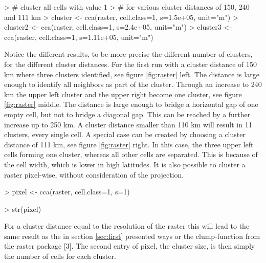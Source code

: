 \documentclass[10pt,a4paper]{article}
\begin{document}
\begin{Schunk}
\begin{Sinput}
> # cluster all cells with value 1
> # for various cluster distances of 150, 240 and 111 km
> cluster <- cca(raster, cell.class=1, s=1.5e+05, unit="m")
> cluster2 <- cca(raster, cell.class=1, s=2.4e+05, unit="m")
> cluster3 <- cca(raster, cell.class=1, s=1.11e+05, unit="m")
\end{Sinput}
\end{Schunk}


Notice the different results, to be more precise the different number of clusters, for the different cluster distances. For the first run with a cluster distance of 150 km where three clusters identified, see figure \ref{fig:raster} left. The distance is large enough to identify all neighbors as part of the cluster. Through an increase to 240 km the upper left cluster and the upper right become one cluster, see figure \ref{fig:raster} middle. The distance is large enough to bridge a horizontal gap of one empty cell, but not to bridge a diagonal gap. This can be reached by a further increase up to 250 km.
A cluster distance smaller than 110 km will result in 11 clusters, every single cell. A special case can be created by choosing a cluster distance of 111 km, see figure \ref{fig:raster} right. In this case, the three upper left cells forming one cluster, whereas all other cells are separated. This is because of the cell width, which is lower in high latitudes.
It is also possible to cluster a raster pixel-wise, without consideration of the projection.
\begin{Schunk}
\begin{Sinput}
> pixel <- cca(raster, cell.class=1, s=1)
\end{Sinput}
\end{Schunk}
\begin{Schunk}
\begin{Sinput}
> str(pixel)
\end{Sinput}
\end{Schunk}
For a cluster distance equal to the resolution of the raster this will lead to the same result as the in section \ref{sec:first} presented ways or the clump-function from the raster package [3]. The second entry of pixel, the cluster size, is then simply the number of cells for each cluster.
\end{document}
